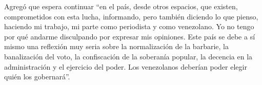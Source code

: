 \documentclass{article}%
\begin{document}
\newline%
%
Agregó que espera continuar “en el país, desde otros espacios, que existen, comprometidos con esta lucha, informando, pero también diciendo lo que pienso, haciendo mi trabajo, mi parte como periodista y como venezolano. Yo no tengo por qué andarme disculpando por expresar mis opiniones. Este país se debe a sí mismo una reflexión muy seria sobre la normalización de la barbarie, la banalización del voto, la confiscación de la soberanía popular, la decencia en la administración y el ejercicio del poder. Los venezolanos deberían poder elegir quién los gobernará”.%
\newline%
%
\end{document}
